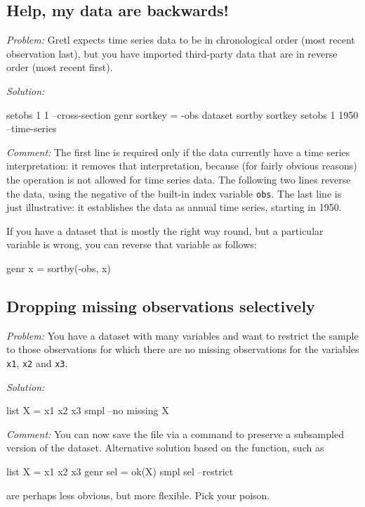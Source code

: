 \subsection{Help, my data are backwards!}

\emph{Problem:} Gretl expects time series data to be in chronological
order (most recent observation last), but you have imported
third-party data that are in reverse order (most recent first).

\emph{Solution:}
\begin{code}
setobs 1 1 --cross-section
genr sortkey = -obs
dataset sortby sortkey
setobs 1 1950 --time-series
\end{code}

\emph{Comment:} The first line is required only if the data currently
have a time series interpretation: it removes that interpretation,
because (for fairly obvious reasons) the 
operation is not allowed for time series data.  The following two
lines reverse the data, using the negative of the built-in index
variable \texttt{obs}.  The last line is just illustrative: it
establishes the data as annual time series, starting in 1950.

If you have a dataset that is mostly the right way round, but a
particular variable is wrong, you can reverse that variable as
follows:
\begin{code}
genr x = sortby(-obs, x)
\end{code}


\subsection{Dropping missing observations selectively}

\emph{Problem:} You have a dataset with many variables and want to
restrict the sample to those observations for which there are no
missing observations for the variables \texttt{x1}, \texttt{x2} and
\texttt{x3}.

\begin{samepage}
\emph{Solution:}
\begin{code}
list X = x1 x2 x3
smpl --no missing X
\end{code}
\end{samepage}

\emph{Comment:} You can now save the file via a  command
to preserve a subsampled version of the dataset. Alternative solution
based on the  function, such as
\begin{code}
list X = x1 x2 x3
genr sel = ok(X)
smpl sel --restrict
\end{code}
are perhaps less obvious, but more flexible. Pick your poison.

